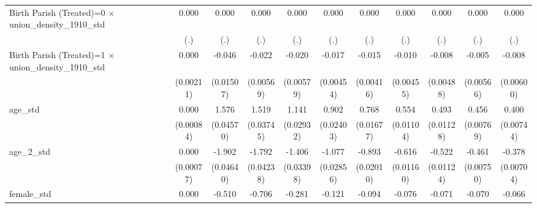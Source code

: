 {\begin{tabular}{l*{10}{c}}
Birth Parish (Treated)=0 $\times$ union\_density\_1910\_std&       0.000         &       0.000         &       0.000         &       0.000         &       0.000         &       0.000         &       0.000         &       0.000         &       0.000         &       0.000         \\
                    &         (.)         &         (.)         &         (.)         &         (.)         &         (.)         &         (.)         &         (.)         &         (.)         &         (.)         &         (.)         \\
Birth Parish (Treated)=1 $\times$ union\_density\_1910\_std&       0.000         &      -0.046\sym{**} &      -0.022\sym{***}&      -0.020\sym{***}&      -0.017\sym{***}&      -0.015\sym{***}&      -0.010\sym{*}  &      -0.008         &      -0.005         &      -0.008         \\
                    &   (0.00211)         &   (0.01507)         &   (0.00569)         &   (0.00579)         &   (0.00454)         &   (0.00416)         &   (0.00455)         &   (0.00488)         &   (0.00566)         &   (0.00600)         \\
age\_std             &       0.000         &       1.576\sym{***}&       1.519\sym{***}&       1.141\sym{***}&       0.902\sym{***}&       0.768\sym{***}&       0.554\sym{***}&       0.493\sym{***}&       0.456\sym{***}&       0.400\sym{***}\\
                    &   (0.00084)         &   (0.04570)         &   (0.03745)         &   (0.02932)         &   (0.02403)         &   (0.01677)         &   (0.01104)         &   (0.01128)         &   (0.00769)         &   (0.00744)         \\
age\_2\_std           &       0.000         &      -1.902\sym{***}&      -1.792\sym{***}&      -1.406\sym{***}&      -1.077\sym{***}&      -0.893\sym{***}&      -0.616\sym{***}&      -0.522\sym{***}&      -0.461\sym{***}&      -0.378\sym{***}\\
                    &   (0.00077)         &   (0.04640)         &   (0.04238)         &   (0.03398)         &   (0.02856)         &   (0.02010)         &   (0.01160)         &   (0.01124)         &   (0.00750)         &   (0.00704)         \\
female\_std          &       0.000         &      -0.510\sym{***}&      -0.706\sym{***}&      -0.281\sym{***}&      -0.121\sym{***}&      -0.094\sym{***}&      -0.076\sym{***}&      -0.071\sym{***}&      -0.070\sym{***}&      -0.066\sym{***}\\

\end{tabular}}
